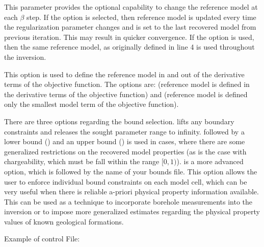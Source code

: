 \begin{description}[leftmargin=5cm, style=sameline, align=left]
\item[\codeName{CHANGE\_MREF \textbar  NOT\_CHANGE\_MREF}] This parameter provides the optional capability to change the reference model at each $\beta$ step. If the  option is selected, then reference model is updated every time the regularization parameter changes and is set to the last recovered model from previous iteration. This may result in quicker convergence. If the  option is used, then the same reference model, as originally defined in line 4 is used throughout the inversion.
\item[\codeName{SMOOTH\_MOD \textbar SMOOTH\_MOD\_DIF}] This option is used to define the reference model in and out of the derivative terms of the objective function. The options are:  (reference model is defined in the derivative terms of the objective function) and  (reference model is defined only the smallest model term of the objective function).
\item[\codeName{BOUNDS}] There are three options regarding the bound selection.  lifts any boundary constraints and releases the sought parameter range to infinity.  followed by a lower bound () and an upper bound () is used in cases, where there are some generalized restrictions on the recovered model properties (as is the case with chargeability, which must be fall within the range $[0,1)$).  is a more advanced option, which is followed by the name of your bounds file. This option allows the user to enforce individual bound constraints on each model cell, which can be very useful when there is reliable a-priori physical property information available. This can be used as a technique to incorporate borehole measurements into the inversion or to impose more generalized estimates regarding the physical property values of known geological formations.
\end{description} 

Example of  control File: 


